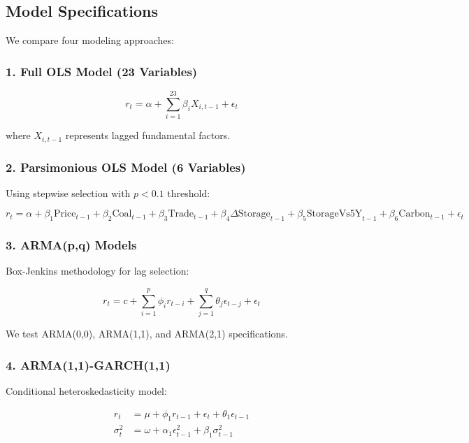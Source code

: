 \documentclass[12pt,a4paper]{article}
\begin{document}
\subsection{Model Specifications}

We compare four modeling approaches:

\subsubsection{1. Full OLS Model (23 Variables)}

\begin{equation}
r_t = \alpha + \sum_{i=1}^{23} \beta_i X_{i,t-1} + \epsilon_t
\end{equation}

where $X_{i,t-1}$ represents lagged fundamental factors.

\subsubsection{2. Parsimonious OLS Model (6 Variables)}

Using stepwise selection with $p < 0.1$ threshold:

\begin{equation}
r_t = \alpha + \beta_1 \text{Price}_{t-1} + \beta_2 \text{Coal}_{t-1} + \beta_3 \text{Trade}_{t-1} + \beta_4 \Delta\text{Storage}_{t-1} + \beta_5 \text{StorageVs5Y}_{t-1} + \beta_6 \text{Carbon}_{t-1} + \epsilon_t
\end{equation}

\subsubsection{3. ARMA(p,q) Models}

Box-Jenkins methodology for lag selection:

\begin{equation}
r_t = c + \sum_{i=1}^{p} \phi_i r_{t-i} + \sum_{j=1}^{q} \theta_j \epsilon_{t-j} + \epsilon_t
\end{equation}

We test ARMA(0,0), ARMA(1,1), and ARMA(2,1) specifications.

\subsubsection{4. ARMA(1,1)-GARCH(1,1)}

Conditional heteroskedasticity model:

\begin{align}
r_t &= \mu + \phi_1 r_{t-1} + \epsilon_t + \theta_1 \epsilon_{t-1} \\
\sigma_t^2 &= \omega + \alpha_1 \epsilon_{t-1}^2 + \beta_1 \sigma_{t-1}^2
\end{align}
\end{document}
